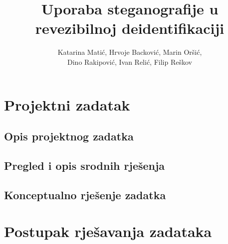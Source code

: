 \documentclass[times, utf8, seminar]{fer}
\begin{document}
\title{Uporaba steganografije u revezibilnoj deidentifikaciji}

\author{	Katarina Matić,
	Hrvoje Backović,
	Marin Oršić,\\
	Dino Rakipović,
	Ivan Relić,
	Filip Reškov	}



\maketitle

\tableofcontents

\chapter{Projektni zadatak}
\section{Opis projektnog zadatka}
\section{Pregled i opis srodnih rješenja}
\section{Konceptualno rješenje zadatka}

\chapter{Postupak rješavanja zadataka}
\end{document}
